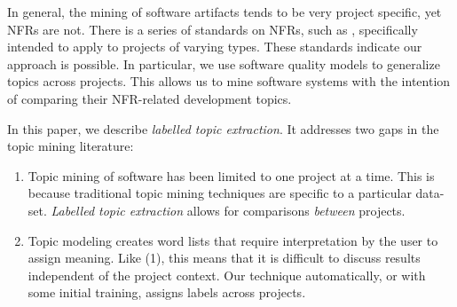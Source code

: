 \documentclass[]{sig-alternate}
\begin{document}
In general, the mining of software artifacts tends to be very project specific, yet NFRs are not. 
There is a series of standards on NFRs, such as \cite{iso9126}, specifically intended to apply to projects of varying types.
These standards indicate our approach is possible. %
In particular, we use software quality models to generalize topics across projects. 
This allows us to mine software systems with the intention of comparing their NFR-related development topics.



In this paper, we describe \emph{labelled topic extraction}. It addresses two gaps in the topic mining literature:
\begin{enumerate}
  \item Topic mining of software has been limited to one project at a time. 
This is because traditional topic mining techniques are specific to a particular data-set. 
\textit{Labelled topic extraction} allows for comparisons \textit{between} projects. 
  \item Topic modeling creates word lists that require interpretation by the user to assign meaning. 
Like (1), this means
that it is difficult to discuss results independent of the project context. 
Our technique automatically, or with some initial training, assigns labels across projects.
\end{enumerate}
\end{document}
